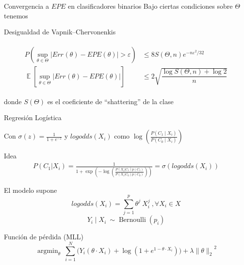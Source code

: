 \documentclass[xcolor=x11names]{beamer}
\DeclareMathOperator{\Expect}{\mathbb{E}}
\DeclareMathOperator{\trainsetn}{\mathcal{T}^{(n)}}
\begin{document}

\begin{frame}{Convergencia a $EPE$ en clasificadores binarios}
Bajo ciertas condiciones sobre $\Theta$ tenemos
	\begin{block}{Desigualdad de Vapnik–Chervonenkis}

		\begin{align*}
			\begin{split}
				P\left(\sup_{\theta\in \Theta}\left|Err_{\trainsetn}(\theta)-EPE (\theta)\right|>\varepsilon \right) & \leq
				8S (\Theta,n) e^{{-n \varepsilon^{2}/32}}\\
				\Expect\left[\sup_{\theta \in \Theta}\left| Err_{\trainsetn}(\theta)-EPE (\theta)\right|\right] &
				\leq 2\sqrt{\dfrac{\log S(\Theta,n)+\log2}{n}}
			\end{split}
		\end{align*}
		
	\end{block}
	donde $S(\Theta)$ es el coeficiente de ``shattering'' de la clase
\end{frame}


\begin{frame}[shrink=5]{Regresión Logística}

Con $\sigma(z) = \frac{1}{1 + e^{-z}}$ y $logodds(X_i)$ como $\log \left(  \frac{ P(C_1 \mid X_i)}{P(C_0 \mid X_i ) } \right)$
	\begin{block}{Idea}
	\footnotesize
		\begin{align*}
			P(C_1| X_i)  = \frac{1}{1 + \exp \left(- \log \left(  \frac{ P(X_i|C_1)p(C_1)}{P(X_i|C_0)p(C_0)} \right) \right)} = \sigma\left(logodds(X_i)\right)
		\end{align*}
	
		El modelo supone
		$$logodds(X_i) = \sum_{j=1}^p \theta^j \ X_i^j  \ , \forall X_i \in X $$
		$$Y_i \mid X_i \ \sim \operatorname{Bernoulli}(p_i)$$

	\end{block}

	\begin{block}{Función de pérdida (MLL)}
		$$\operatorname{argmin}_{\theta} \ \sum_{i=1}^N \big(Y_i ( \theta \cdot X_i ) + \log(1 + e^{1- \theta \cdot X_i} ) \big) + \lambda { \| \theta \|_{2}}^2$$
	\end{block}
\end{frame}
\end{document}
